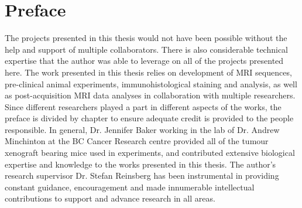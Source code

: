 
\chapter{Preface}
\label{ch:preface}

The projects presented in this thesis would not have been possible without the help and support of multiple collaborators.
There is also considerable technical expertise that the author was able to leverage on all of the projects presented here.
The work presented in this thesis relies on development of MRI sequences, pre-clinical animal experiments, immunohistological staining and analysis, as well as post-acquisition MRI data analyses in collaboration with multiple researchers.
Since different researchers played a part in different aspects of the works, the preface is divided by chapter to ensure adequate credit is provided to the people responsible.
In general, Dr. Jennifer Baker working in the lab of Dr. Andrew Minchinton at the BC Cancer Research centre provided all of the tumour xenograft bearing mice used in experiments, and contributed extensive biological expertise and knowledge to the works presented in this thesis.
The author's research supervisor Dr. Stefan Reinsberg has been instrumental in providing constant guidance, encouragement and made innumerable intellectual contributions to support and advance research in all areas.

%

